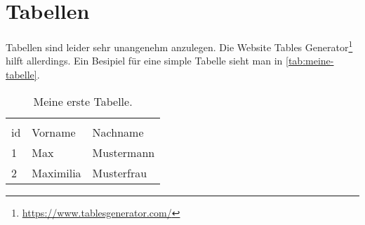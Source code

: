 \newpage
\section{Tabellen}

Tabellen sind leider sehr unangenehm anzulegen. Die Website Tables Generator\footnote{\href{https://www.tablesgenerator.com/}{https://www.tablesgenerator.com/}} hilft allerdings. Ein Besipiel für eine simple Tabelle sieht man in \autoref{tab:meine-tabelle}.

\begin{table}[h]
    \centering
    \begin{tabular}{lll}
    \multicolumn{3}{l}{}                         \\
    id       & Vorname         & Nachname        \\ \hline
    1        & Max             & Mustermann      \\
    2        & Maximilia       & Musterfrau     
    \end{tabular}
    \caption{Meine erste Tabelle.}
    \label{tab:meine-tabelle}
\end{table}

